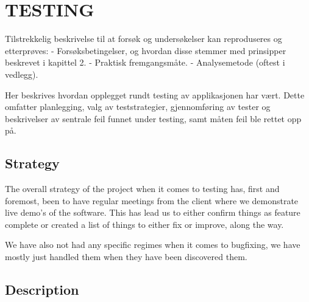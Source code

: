 \chapter{TESTING}
Tilstrekkelig beskrivelse til at forsøk og undersøkelser kan reproduseres og etterprøves:
- Forsøksbetingelser, og hvordan disse stemmer med prinsipper beskrevet i kapittel 2.
- Praktisk fremgangsmåte.
- Analysemetode (oftest i vedlegg).

Her beskrives hvordan opplegget rundt testing av applikasjonen har vært. Dette omfatter
planlegging, valg av teststrategier, gjennomføring av tester og beskrivelser av sentrale feil funnet
under testing, samt måten feil ble rettet opp på.

\section{Strategy}
The overall strategy of the project when it comes to testing has, first and
foremost, been to have regular meetings from the client where we demonstrate
live demo's of the software. This has lead us to either confirm things as
feature complete or created a list of things to either fix or improve, along the
way. 

We have also not had any specific regimes when it comes to bugfixing, we have
mostly just handled them when they have been discovered them. 
\section{Description}